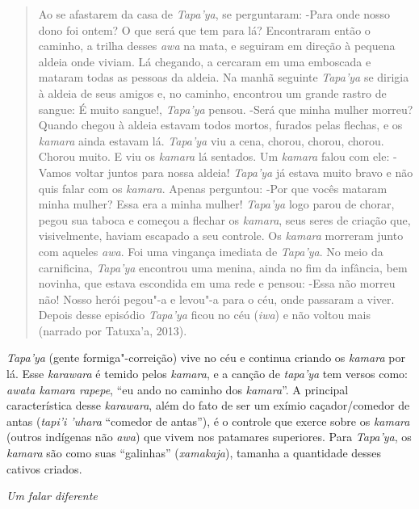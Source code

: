 \begin{quote}
Ao se afastarem da casa de \emph{Tapa'ya}, se perguntaram: -Para onde
nosso dono foi ontem? O que será que tem para lá? Encontraram então o
caminho, a trilha desses \emph{awa} na mata, e seguiram em direção à
pequena aldeia onde viviam. Lá chegando, a cercaram em uma emboscada e
mataram todas as pessoas da aldeia. Na manhã seguinte \emph{Tapa'ya} se
dirigia à aldeia de seus amigos e, no caminho, encontrou um grande
rastro de sangue: É muito sangue!, \emph{Tapa'ya} pensou. -Será que
minha mulher morreu? Quando chegou à aldeia estavam todos mortos,
furados pelas flechas, e os \emph{kamara} ainda estavam lá.
\emph{Tapa'ya} viu a cena, chorou, chorou, chorou. Chorou muito. E viu
os \emph{kamara} lá sentados. Um \emph{kamara} falou com ele: -Vamos
voltar juntos para nossa aldeia! \emph{Tapa'ya} já estava muito bravo e
não quis falar com os \emph{kamara}. Apenas perguntou: -Por que vocês
mataram minha mulher? Essa era a minha mulher! \emph{Tapa'ya} logo parou
de chorar, pegou sua taboca e começou a flechar os \emph{kamara}, seus
seres de criação que, visivelmente, haviam escapado a seu controle. Os
\emph{kamara} morreram junto com aqueles \emph{awa}. Foi uma vingança
imediata de \emph{Tapa'ya}. No meio da carnificina, \emph{Tapa'ya}
encontrou uma menina, ainda no fim da infância, bem novinha, que estava
escondida em uma rede e pensou: -Essa não morreu não! Nosso herói
pegou"-a e levou"-a para o céu, onde passaram a viver. Depois desse
episódio \emph{Tapa'ya} ficou no céu (\emph{iwa}) e não voltou mais
(narrado por Tatuxa'a, 2013).
\end{quote}

\emph{Tapa'ya} (gente formiga"-correição) vive no céu e continua criando
os \emph{kamara} por lá. Esse \emph{karawara} é temido pelos
\emph{kamara}, e a canção de \emph{tapa'ya} tem versos como: \emph{awata
kamara rapepe}, ``eu ando no caminho dos \emph{kamara}''. A principal
característica desse \emph{karawara}, além do fato de ser um exímio
caçador/comedor de antas (\emph{tapi'i 'uhara} ``comedor de antas''), é
o controle que exerce sobre os \emph{kamara} (outros indígenas não
\emph{awa}) que vivem nos patamares superiores. Para \emph{Tapa'ya}, os
\emph{kamara} são como suas ``galinhas'' (\emph{xamakaja}), tamanha a
quantidade desses cativos criados.

\emph{Um falar diferente}


